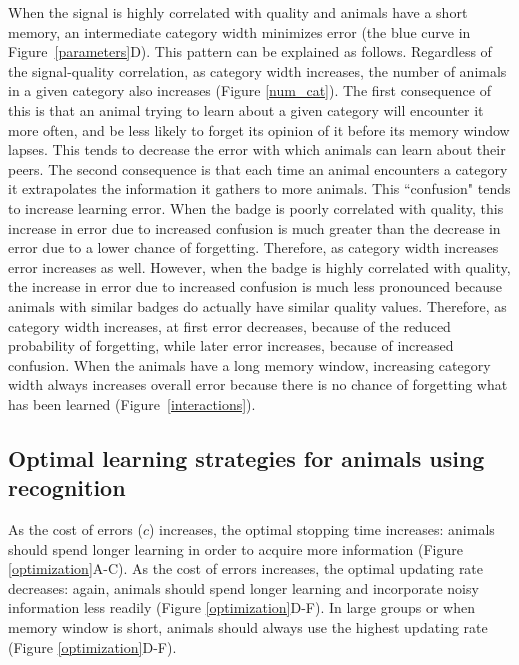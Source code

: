 When the signal is highly correlated with quality and animals have a short memory, an intermediate category width minimizes error (the blue curve in Figure~\ref{parameters}D). This pattern can be explained as follows. Regardless of the signal-quality correlation, as category width increases, the number of animals in a given category also increases (Figure \ref{num_cat}). The first consequence of this is that an animal trying to learn about a given category will encounter it more often, and be less likely to forget its opinion of it before its memory window lapses. This tends to decrease the error with which animals can learn about their peers. The second consequence is that each time an animal encounters a category it extrapolates the information it gathers to more animals. This ``confusion" tends to increase learning error. When the badge is poorly correlated with quality, this increase in error due to increased confusion is much greater than the decrease in error due to a lower chance of forgetting. Therefore, as category width increases error increases as well. However, when the badge is highly correlated with quality, the increase in error due to increased confusion is much less pronounced because animals with similar badges do actually have similar quality values. Therefore, as category width increases, at first error decreases, because of the reduced probability of forgetting, while later error increases, because of increased confusion. When the animals have a long memory window, increasing category width always increases overall error because there is no chance of forgetting what has been learned (Figure~\ref{interactions}). 

\subsection*{Optimal learning strategies for animals using recognition}
As the cost of errors ($c$) increases, the optimal stopping time increases: animals should spend longer learning in order to acquire more information (Figure \ref{optimization}A-C). As the cost of errors increases, the optimal updating rate decreases: again, animals should spend longer learning and incorporate noisy information less readily (Figure \ref{optimization}D-F). In large groups or when memory window is short, animals should always use the highest updating rate (Figure \ref{optimization}D-F). 

